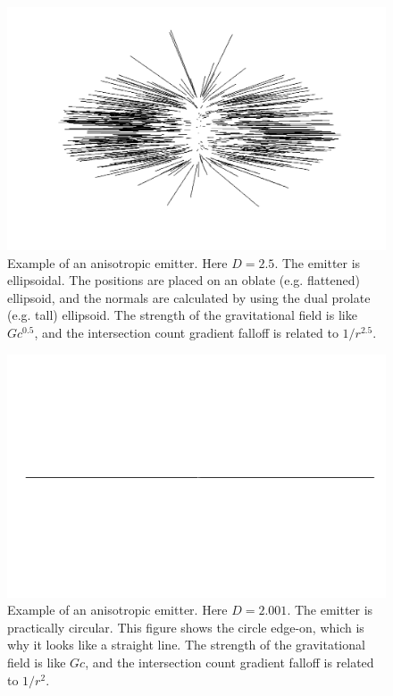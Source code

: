 \documentclass[12pt]{article}
\begin{document}
\begin{figure} 
\centering
  \includegraphics[width = 5 in]{2.5.png}
  \caption{
Example of an anisotropic emitter.
Here $D = 2.5$. 
The emitter is ellipsoidal.
The positions are placed on an oblate (e.g. flattened) ellipsoid, and the normals are calculated by using the dual prolate (e.g. tall) ellipsoid.
The strength of the gravitational field is like $G c^{0.5}$, and the intersection count gradient falloff is related to $1/r^{2.5}$.
}
\end{figure}


\begin{figure} 
\centering
  \includegraphics[width = 5 in]{2.png}
  \caption{
Example of an anisotropic emitter.
Here $D = 2.001$. 
The emitter is practically circular. 
This figure shows the circle edge-on, which is why it looks like a straight line.
The strength of the gravitational field is like $Gc$, and the intersection count gradient falloff is related to $1/r^2$.
}
\end{figure}
\end{document}
